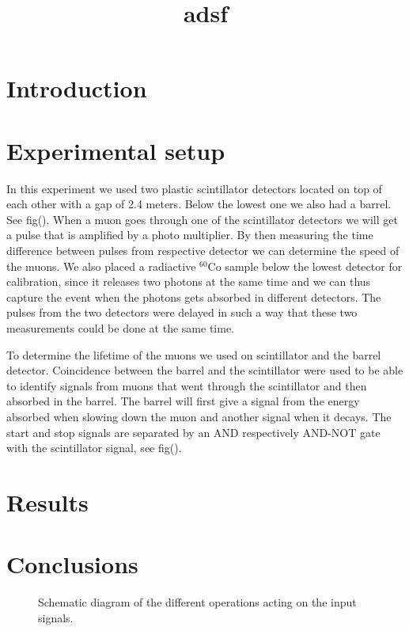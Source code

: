 \documentclass[12pt,twocolumn]{article}
\title{adsf}
\author{}
\begin{document}
\tableofcontents
\renewcommand{\abstractname}{Abstract}
\begin{abstract}
\end{abstract}
\section{Introduction}

\section{Experimental setup}
In this experiment we used two plastic scintillator detectors located on top of each other with a gap of 2.4 meters. Below the lowest one we also had a barrel. See fig(). When a muon goes through one of the scintillator detectors we will get a pulse that is amplified by a photo multiplier. By then measuring the time difference between pulses from respective detector we can determine the speed of the muons. We also placed a radiactive $^{60}$Co sample below the lowest detector for calibration, since it releases two photons at the same time and we can thus capture the event when the photons gets absorbed in different detectors. The pulses from the two detectors were delayed in such a way that these two measurements could be done at the same time.\newline

To determine the lifetime of the muons we used on scintillator and the barrel detector. Coincidence between the barrel and the scintillator were used to be able to identify signals from muons that went through the scintillator and then absorbed in the barrel. The barrel will first give a signal from the energy absorbed when slowing down the muon and another signal when it decays. The start and stop signals are separated by an AND respectively AND-NOT gate with the scintillator signal, see fig().



\section{Results}



\section{Conclusions}




\begin{figure}[h]

\caption{\label{setup} Schematic diagram of the different operations acting on the input signals.}
\end{figure}
\end{document}
